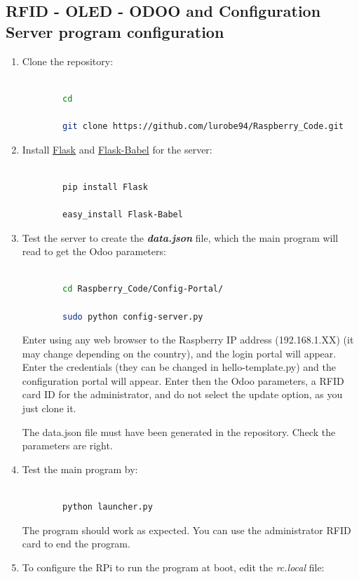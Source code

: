 \documentclass[12pt,a4paper,oneside]{article} %
\begin{document}
\subsection{RFID - OLED - ODOO and Configuration Server program configuration}

\begin{enumerate}
	\item Clone the repository:
	\begin{lstlisting}[language=sh]
	
		cd
		
		git clone https://github.com/lurobe94/Raspberry_Code.git
	\end{lstlisting}
	\item Install \href{http://flask.pocoo.org/}{Flask} and \href{https://pythonhosted.org/Flask-Babel/}{Flask-Babel} for the server:
	\begin{lstlisting}[language=sh]
	
		pip install Flask
		
		easy_install Flask-Babel
	\end{lstlisting}
	\item Test the server to create the \textbf{\textit{data.json}} file, which the main program will read to get the Odoo parameters:
	\begin{lstlisting}[language=sh]
	
		cd Raspberry_Code/Config-Portal/
		
		sudo python config-server.py
	\end{lstlisting}
	
	Enter using any web browser to the Raspberry IP address (192.168.1.XX) (it may change depending on the country), and the login portal will appear. Enter the credentials (they can be changed in hello-template.py) and the configuration portal will appear. Enter then the Odoo parameters, a RFID card ID for the administrator, and do not select the update option, as you just clone it.
	
	The data.json file must have been generated in the repository. Check the parameters are right.
	\item Test the main program by:
	\begin{lstlisting}[language=sh]
	
		python launcher.py
	\end{lstlisting}
	
	The program should work as expected. You can use the administrator RFID card to end the program.
	\item To configure the RPi to run the program at boot, edit the \textit{rc.local} file:
	\begin{lstlisting}[language=sh]
	

\end{lstlisting}
\end{enumerate}
\end{document}
